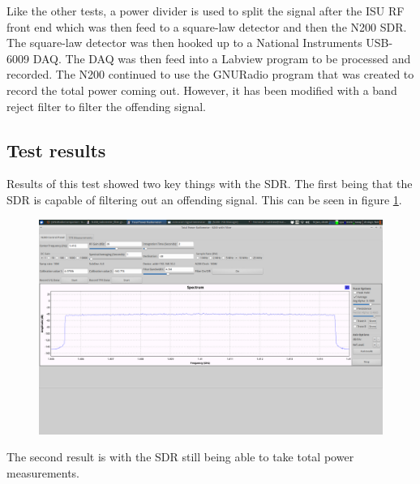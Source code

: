 Like the other tests, a power divider is used to split the signal after the ISU RF front end which was then feed to a square-law detector and then the N200 SDR.  The square-law detector was then hooked up to a National Instruments USB-6009 DAQ.  The DAQ was then feed into a Labview program to be processed and recorded.  The N200 continued to use the GNURadio program that was created to record the total power coming out.  However, it has been modified with a band reject filter to filter the offending signal.

\subsection{Test results}
Results of this test showed two key things with the SDR.  The first being that the SDR is capable of filtering out an offending signal.  This can be seen in figure \ref{filter_on}.

\begin{figure}[h!tb] \centering

\includegraphics[width=\textwidth]{Images/interfering_signal_filter_on.png}

\label{filter_on}
\end{figure}

The second result is with the SDR still being able to take total power measurements. 

